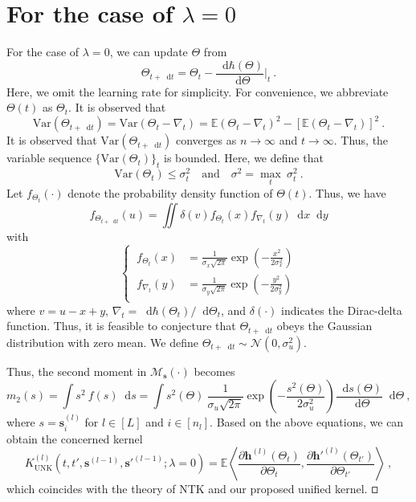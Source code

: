 \documentclass[review,10pt]{JMtemplate}
\newcommand*{\dif}{\mathop{}\!\mathrm{d}}
\begin{document}
\section{For the case of $\lambda=0$}  \label{app:lamda=0}
For the case of $\lambda=0$, we can update $\Theta$ from 
\[
\Theta_{t+ \dif t} = \Theta_t  -  \frac{\dif \hbar(\Theta)}{\dif \Theta} \Big|_t \ .
\]
Here, we omit the learning rate for simplicity. For convenience, we abbreviate $\Theta(t)$ as $\Theta_t$. It is observed that
\[
\mathrm{Var} \left( \Theta_{t+ \dif t} \right) =  \textrm{Var} \left( \Theta_t  -  \nabla_t  \right) = \mathbb{E} \left( \Theta_t  -  \nabla_t \right)^2 - \left[ \mathbb{E} \left( \Theta_t  -  \nabla_t \right) \right] ^2 \ .
\]
It is observed that $\mathrm{Var} ( \Theta_{t+ \dif t} ) $ converges as $n \to \infty$ and $t \to \infty$. Thus, the variable sequence $\{ \mathrm{Var}(\Theta_t) \}_t$ is bounded. Here, we define that 
\[
\mathrm{Var} ( \Theta_{t} ) \leq \sigma_t^2 \quad \text{and}\quad \sigma^2 = \max_t ~\sigma_t^2 \ .
\]
Let $f_{\Theta_t}(\cdot)$ denote the probability density function of $\Theta(t)$. Thus, we have
\[
f_{\Theta_{t+\dif t}}( u )  = \iint \delta(  v  ) f_{\Theta_t}(x) f_{\nabla_t}(y)  \dif x\! \dif y\!  
\]
with
\[
\left\{~ \begin{aligned}
    f_{\Theta_t}(x) &= \frac{1}{\sigma_x \sqrt{2\pi}} \exp \left( -\frac{x^2}{2\sigma_x^2} \right)   \\
    f_{\nabla_t}(y) &= \frac{1}{\sigma_y \sqrt{2\pi}} \exp \left( -\frac{y^2}{2\sigma_y^2} \right)  \\
\end{aligned}\right.
\]
where $v= u- x + y$, $\nabla_t = {\dif \hbar(\Theta_t)}/{\dif \Theta_t}$, and $\delta(\cdot)$ indicates the Dirac-delta function. Thus, it is feasible to conjecture that $\Theta_{t+\dif t}$ obeys the Gaussian distribution with zero mean. We define $\Theta_{t+\dif t} \sim \mathcal{N}(0, \sigma_u^2) $.

Thus, the second moment in $\mathcal{M}_{\boldsymbol{s}} (\cdot)$ becomes 
\[
m_2 (s) = \int s^2  ~f(s) \dif s = \int s^2(\Theta) ~\frac{1}{\sigma_u \sqrt{2\pi}} \exp \left( -\frac{s^2(\Theta)}{2\sigma_u^2} \right) \frac{\dif s(\Theta)}{\dif \Theta} \dif \Theta \ ,
\]
where $s= \boldsymbol{s}^{(l)}_i$ for $l \in [L]$ and $i \in [n_l]$. Based on the above equations, we can obtain the concerned kernel
\[
K_{\textrm{UNK}}^{(l)} \left( t, t', \boldsymbol{s}^{(l-1)}, \boldsymbol{s}'^{(l-1)} ; \lambda=0 \right) = \mathbb{E} \left\langle \frac{\partial \boldsymbol{h}^{(l)}(\Theta_t)}{\partial \Theta_t} , \frac{\partial \boldsymbol{h}'^{(l)}(\Theta_{t'})}{\partial \Theta_{t'}}  \right\rangle  \ ,
\]
which coincides with the theory of NTK and our proposed unified kernel. $\hfill\square$
\end{document}
